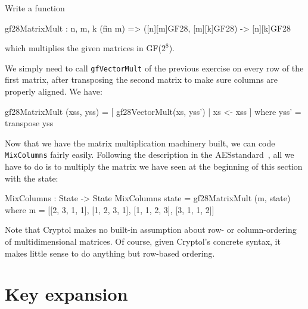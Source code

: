 \begin{Exercise}\label{ex:aesmc:3}
Write a function
\begin{code}
  gf28MatrixMult : {n, m, k} (fin m) => ([n][m]GF28, [m][k]GF28) 
                                      -> [n][k]GF28
\end{code}
which multiplies the given matrices in GF($2^8$)\indGF.
\end{Exercise}
\begin{Answer}
  We simply need to call {\tt gfVectorMult} of the previous exercise
  on every row of the first matrix, after transposing the second
  matrix to make sure columns are properly aligned. We
  have:\indTranspose
\begin{code}
  gf28MatrixMult (xss, yss) = [ gf28VectorMult(xs, yss')
                              | xs <- xss ]
       where yss' = transpose yss
\end{code}
\end{Answer}


\unparagraph Now that we have the matrix multiplication machinery
built, we can code {\tt MixColumns} fairly easily. Following the
description in the AES\indAES standard~\cite[Section 5.3.1]{aes}, all
we have to do is to multiply the matrix we have seen at the beginning
of this section with the state:

\begin{code}
  MixColumns : State -> State
  MixColumns state = gf28MatrixMult (m, state)
    where m = [[2, 3, 1, 1],
               [1, 2, 3, 1],
               [1, 1, 2, 3],
               [3, 1, 1, 2]]
\end{code}

Note that Cryptol makes no built-in assumption about row- or
column-ordering of multidimensional matrices.  Of course, given
Cryptol's concrete syntax, it makes little sense to do anything but
row-based ordering.

\section{Key expansion}
\label{aes:keyexpansion}


